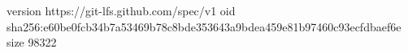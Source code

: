 version https://git-lfs.github.com/spec/v1
oid sha256:e60be0fcb34b7a53469b78c8bde353643a9bdea459e81b97460c93ecfdbaef6e
size 98322
